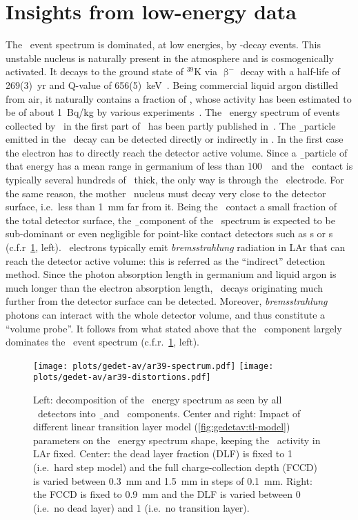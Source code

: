 \section{Insights from low-energy data}%
\label{sec:gedetav:ar39}

The \gerda\ event spectrum is dominated, at low energies, by \Arl-decay events. This
unstable nucleus is naturally present in the atmosphere and is cosmogenically activated.
It decays to the ground state of $^{39}$K via $\upbeta^-$ decay with a half-life of
269(3)~yr and Q-value of 656(5)~keV~\cite{Wang2017}. Being commercial liquid argon distilled from air, it
naturally contains a fraction of \Arl, whose activity has been estimated to be of about
1~Bq/kg by various experiments~\cite{Ajaj2019, Calvo2017, Benetti2006, Loosli1983}. The
\Arl\ energy spectrum of events collected by \gerda\ in the first part of \phasetwo\ has
been partly published in~\cite{Agostini2020}.
\newpar
The \b\ particle emitted in the \Arl\ decay can be detected directly or indirectly in
\gerda. In the first case the electron has to directly reach the detector active volume.
Since a \b\ particle of that energy has a mean range in germanium of less than 100~\mum\
and the \nplus\ contact is typically several hundreds of \mum\ thick, the only way is
through the \pplus\ electrode. For the same reason, the mother \Arl\ nucleus must decay
very close to the detector surface, i.e.~less than 1~mm far from it. Being the \pplus\
contact a small fraction of the total detector surface, the \b\ component of the \Arl\
spectrum is expected to be sub-dominant or even negligible for point-like contact
detectors such as \bege{}s or \icoax{}s (c.f.r~\cref{fig:gedetav:ar39:distortions}, left).
\newpar
\Arl\ electrons typically emit \emph{bremsstrahlung} radiation in LAr that can reach the
detector active volume: this is referred as the ``indirect'' detection method. Since the
photon absorption length in germanium and liquid argon is much longer than the electron
absorption length, \Arl\ decays originating much further from the detector surface can be
detected. Moreover, \emph{bremsstrahlung} photons can interact with the whole detector
volume, and thus constitute a ``volume probe''. It follows from what stated above that the
\g\ component largely dominates the \Arl\ event spectrum
(c.f.r.~\cref{fig:gedetav:ar39:distortions}, left).

\begin{figure}
  \centering
  \texttt{[image: plots/gedet-av/ar39-spectrum.pdf]}%
  \texttt{[image: plots/gedet-av/ar39-distortions.pdf]}
  \caption{%
    Left: decomposition of the \Arl\ energy spectrum as seen by all \gerda\ detectors into
    \b\ and \g\ components. Center and right: Impact of different linear transition layer
    model (\cref{fig:gedetav:tl-model}) parameters on the \Arl\ energy spectrum shape,
    keeping the \Arl\ activity in LAr fixed. Center: the dead layer fraction (DLF) is fixed
    to 1 (i.e.~hard step model) and the full charge-collection depth (FCCD) is varied
    between 0.3~mm and 1.5~mm in steps of 0.1~mm. Right: the FCCD is fixed to 0.9~mm and
    the DLF is varied between 0 (i.e.~no dead layer) and 1 (i.e.~no transition layer).
  }\label{fig:gedetav:ar39:distortions}
\end{figure}

